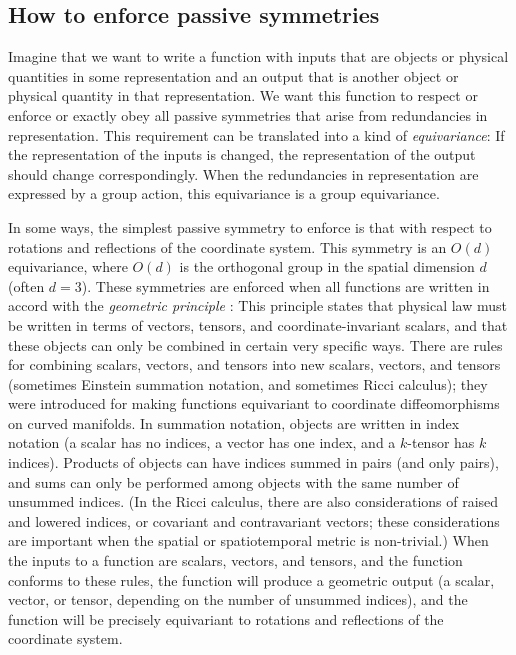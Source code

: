 \documentclass[11pt]{article}
\begin{document}
\subsection*{How to enforce passive symmetries}

Imagine that we want to write a function with inputs that are objects or physical quantities in some representation and an output that is another object or physical quantity in that representation.
We want this function to respect or enforce or exactly obey all passive symmetries that arise from redundancies in representation.
This requirement can be translated into a kind of \emph{equivariance}:
If the representation of the inputs is changed, the representation of the output should change correspondingly.
When the redundancies in representation are expressed by a group action, this equivariance is a group equivariance.

In some ways, the simplest passive symmetry to enforce is that with respect to rotations and reflections of the coordinate system.
This symmetry is an $O(d)$ equivariance, where $O(d)$ is the orthogonal group in the spatial dimension $d$ (often $d=3$).
These symmetries are enforced when all functions are written in accord with the \emph{geometric principle} \cite{mcp}:
This principle states that physical law must be written in terms of vectors, tensors, and coordinate-invariant scalars, and that these objects can only be combined in certain very specific ways.
There are rules for combining scalars, vectors, and tensors into new scalars, vectors, and tensors (sometimes Einstein \cite{einstein} summation notation, and sometimes Ricci \cite{ricci} calculus); they were introduced for making functions equivariant to coordinate diffeomorphisms on curved manifolds.
In summation notation, objects are written in index notation (a scalar has no indices, a vector has one index, and a $k$-tensor has $k$ indices).
Products of objects can have indices summed in pairs (and only pairs), and sums can only be performed among objects with the same number of unsummed indices.
(In the Ricci calculus, there are also considerations of raised and lowered indices, or covariant and contravariant vectors; these considerations are important when the spatial or spatiotemporal metric is non-trivial.)
When the inputs to a function are scalars, vectors, and tensors, and the function conforms to these rules, the function will produce a geometric output (a scalar, vector, or tensor, depending on the number of unsummed indices), and the function will be precisely equivariant to rotations and reflections of the coordinate system.
\end{document}
